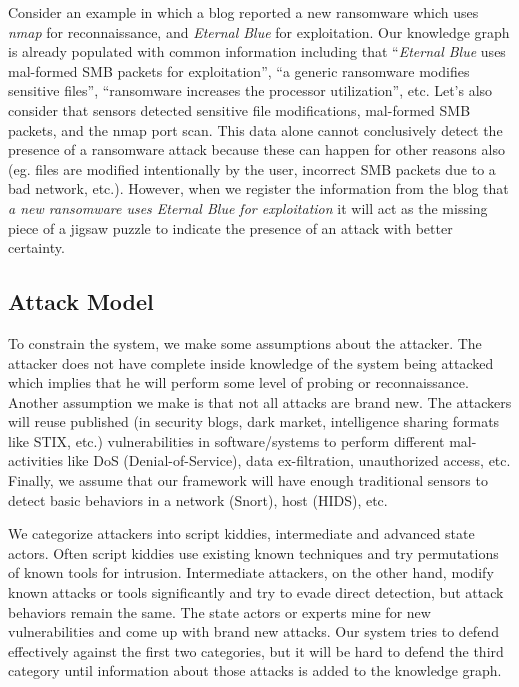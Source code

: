 Consider an example in which a blog reported a new ransomware which uses \textit{nmap} for reconnaissance, and \textit{Eternal Blue} for exploitation. Our knowledge graph is already populated with common information including that ``\textit{Eternal Blue} uses mal-formed SMB packets for exploitation'', ``a generic ransomware modifies sensitive files'', ``ransomware increases the processor utilization'', etc. Let's also consider that sensors detected sensitive file modifications, mal-formed SMB packets, and the nmap port scan. This data alone cannot conclusively detect the presence of a ransomware attack because these can happen for other reasons also (eg. files are modified intentionally by the user, incorrect SMB packets due to a bad network, etc.). However, when we register the information from the blog that \textit{a new ransomware uses Eternal Blue for exploitation} it will act as the missing piece of a jigsaw puzzle to indicate the presence of an attack with better certainty. 

\subsection{Attack Model}

To constrain the system, we make some assumptions about the attacker. The attacker does not have complete inside knowledge of the system being attacked which implies that he will perform some level of probing or reconnaissance. Another assumption we make is that not all attacks are brand new. The attackers will reuse published (in security blogs, dark market, intelligence sharing formats like STIX, etc.) vulnerabilities in software/systems to perform different mal-activities like DoS (Denial-of-Service), data ex-filtration, unauthorized access, etc. Finally, we assume that our framework will have enough traditional sensors to detect basic behaviors in a network (Snort), host (HIDS), etc. 

We categorize attackers into script kiddies, intermediate and advanced state actors. Often script kiddies use existing known techniques and try permutations of known tools for intrusion. Intermediate attackers, on the other hand, modify known attacks or tools significantly and try to evade direct detection, but attack behaviors remain the same.  The state actors or experts mine for new vulnerabilities and come up with brand new attacks. Our system tries to defend effectively against the first two categories, but it will be hard to defend the third category until information about those attacks is added to the knowledge graph.

